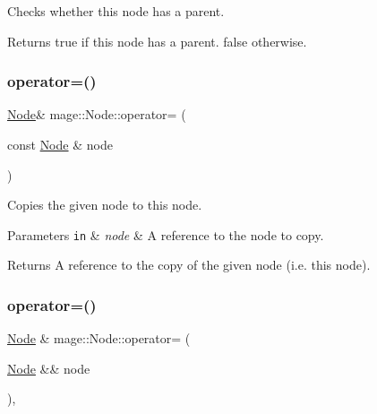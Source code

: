 Checks whether this node has a parent.

\begin{DoxyReturn}{Returns}
{\ttfamily true} if this node has a parent. {\ttfamily false} otherwise. 
\end{DoxyReturn}
\hypertarget{classmage_1_1_node_ad10ea13608963acfa06d3c1577314da5}{}\label{classmage_1_1_node_ad10ea13608963acfa06d3c1577314da5} 
\subsubsection{\texorpdfstring{operator=()}{operator=()}\hspace{0.1cm}{\footnotesize\ttfamily [1/2]}}
{\footnotesize\ttfamily \hyperlink{classmage_1_1_node}{Node}\& mage\+::\+Node\+::operator= (\begin{DoxyParamCaption}\item[{const \hyperlink{classmage_1_1_node}{Node} \&}]{node }\end{DoxyParamCaption})\hspace{0.3cm}{\ttfamily [delete]}}

Copies the given node to this node.


\begin{DoxyParams}[1]{Parameters}
\mbox{\tt in}  & {\em node} & A reference to the node to copy. \\
\hline
\end{DoxyParams}
\begin{DoxyReturn}{Returns}
A reference to the copy of the given node (i.\+e. this node). 
\end{DoxyReturn}
\hypertarget{classmage_1_1_node_a10d0ed7f0ade94ce7cbd6f413ae82757}{}\label{classmage_1_1_node_a10d0ed7f0ade94ce7cbd6f413ae82757} 
\subsubsection{\texorpdfstring{operator=()}{operator=()}\hspace{0.1cm}{\footnotesize\ttfamily [2/2]}}
{\footnotesize\ttfamily \hyperlink{classmage_1_1_node}{Node} \& mage\+::\+Node\+::operator= (\begin{DoxyParamCaption}\item[{\hyperlink{classmage_1_1_node}{Node} \&\&}]{node }\end{DoxyParamCaption})\hspace{0.3cm}{\ttfamily [default]}, {\ttfamily [noexcept]}}

